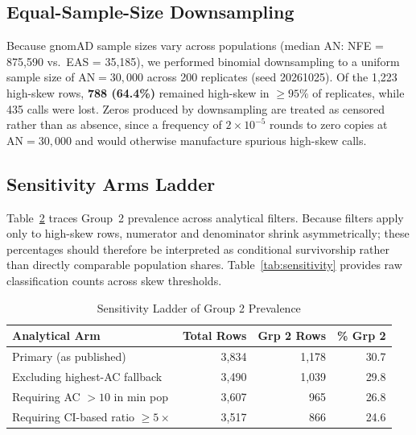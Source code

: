 \documentclass[conference]{IEEEtran}
\begin{document}
\begin{table}[!t]
\subsection{Equal-Sample-Size Downsampling}

Because gnomAD sample sizes vary across populations (median AN: NFE = 875,590 vs.\ EAS = 35,185), we performed binomial downsampling to a uniform sample size of $\text{AN} = 30{,}000$ across 200 replicates (seed 20261025).
Of the 1,223 high-skew rows, \textbf{788 (64.4\%)} remained high-skew in $\ge 95\%$ of replicates, while 435 calls were lost.
Zeros produced by downsampling are treated as censored rather than as absence, since a frequency of $2 \times 10^{-5}$ rounds to zero copies at $\text{AN} = 30{,}000$ and would otherwise manufacture spurious high-skew calls.

\subsection{Sensitivity Arms Ladder}

Table~\ref{tab:sensitivity-ladder} traces Group~2 prevalence across analytical filters.
Because filters apply only to high-skew rows, numerator and denominator shrink asymmetrically; these percentages should therefore be interpreted as conditional survivorship rather than directly comparable population shares.
Table~\ref{tab:sensitivity} provides raw classification counts across skew thresholds.

\begin{table}[!t]
\centering
\caption{Sensitivity Ladder of Group 2 Prevalence}
\label{tab:sensitivity-ladder}
\renewcommand{\arraystretch}{1.15}
\begin{tabular}{|l|r|r|r|}
\hline
\textbf{Analytical Arm} & \textbf{Total Rows} & \textbf{Grp 2 Rows} & \textbf{\% Grp 2} \\
\hline
Primary (as published) & 3,834 & 1,178 & 30.7 \\
\hline
Excluding highest-AC fallback & 3,490 & 1,039 & 29.8 \\
\hline
Requiring AC $> 10$ in min pop & 3,607 &   965 & 26.8 \\
\hline
Requiring CI-based ratio $\ge 5\times$ & 3,517 &   866 & 24.6 \\
\hline
\end{tabular}
\end{table}


\end{table}
\end{document}
